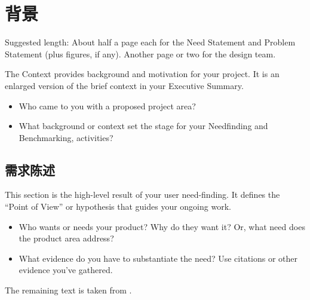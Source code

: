 \chapter{背景}
\label{sec-context} %

\begin{remark} \color{blue}
Suggested length: About half a page each for the Need Statement and Problem Statement (plus figures, if any). Another page or two for the design team.
\vspace{0.1in}

\noindent The Context provides background and motivation for your project. It is an enlarged version of the brief context in your Executive Summary.  
\begin{itemize} \tightlist
\item Who came to you with a proposed project area? 
\item What background or context set the stage for your Needfinding and Benchmarking, activities?
\end{itemize}
\normalcolor \end{remark}

\section{需求陈述}
\label{sec:need}

\begin{remark} \color{blue}
This section is the high-level result of your user need-finding. It defines the ``Point of View'' or hypothesis that guides your ongoing work. 
\begin{itemize} \tightlist
\item Who wants or needs your product? Why do they want it? Or, what need does the product area address? 
\item What evidence do you have to substantiate the need? Use citations or other evidence you've gathered.
\end{itemize}

\noindent The remaining text is taken from \cite{Autodesk2008Fall}.
\normalcolor
\end{remark}


